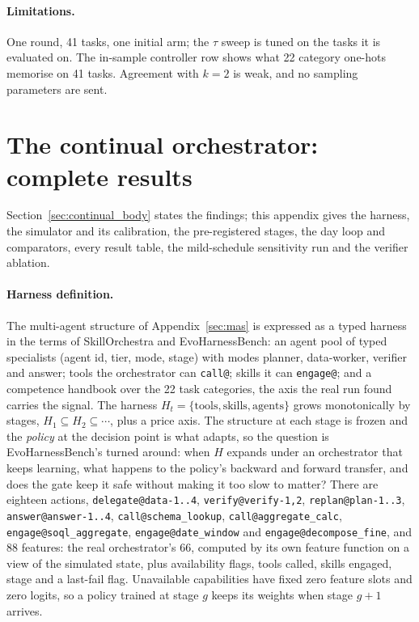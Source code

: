 \documentclass[10pt]{article}
\newcommand{\code}[1]{\texttt{#1}}
\begin{document}
\paragraph{Limitations.} One round, 41 tasks, one initial arm; the $\tau$ sweep is tuned on the tasks it is evaluated on. The in-sample controller row shows what 22 category one-hots memorise on 41 tasks. Agreement with $k=2$ is weak, and no sampling parameters are sent.

\section{The continual orchestrator: complete results}
\label{sec:continual}

Section~\ref{sec:continual_body} states the findings; this appendix gives the harness, the simulator and its calibration, the pre-registered stages, the day loop and comparators, every result table, the mild-schedule sensitivity run and the verifier ablation.

\paragraph{Harness definition.} The multi-agent structure of Appendix~\ref{sec:mas} is expressed as a typed harness in the terms of SkillOrchestra and EvoHarnessBench: an agent pool of typed specialists (agent id, tier, mode, stage) with modes planner, data-worker, verifier and answer; tools the orchestrator can \code{call@}; skills it can \code{engage@}; and a competence handbook over the 22 task categories, the axis the real run found carries the signal. The harness $H_t=\{\text{tools},\text{skills},\text{agents}\}$ grows monotonically by stages, $H_1\subseteq H_2\subseteq\cdots$, plus a price axis. The structure at each stage is frozen and the \emph{policy} at the decision point is what adapts, so the question is EvoHarnessBench's turned around: when $H$ expands under an orchestrator that keeps learning, what happens to the policy's backward and forward transfer, and does the gate keep it safe without making it too slow to matter? There are eighteen actions, \code{delegate@data-1..4}, \code{verify@verify-1,2}, \code{replan@plan-1..3}, \code{answer@answer-1..4}, \code{call@schema\_lookup}, \code{call@aggregate\_calc}, \code{engage@soql\_aggregate}, \code{engage@date\_window} and \code{engage@decompose\_fine}, and 88 features: the real orchestrator's 66, computed by its own feature function on a view of the simulated state, plus availability flags, tools called, skills engaged, stage and a last-fail flag. Unavailable capabilities have fixed zero feature slots and zero logits, so a policy trained at stage $g$ keeps its weights when stage $g+1$ arrives.
\end{document}
